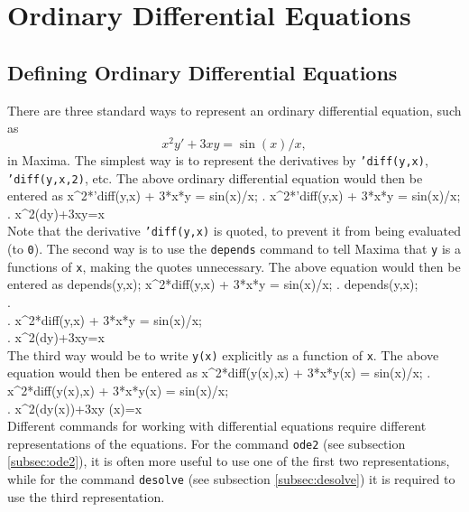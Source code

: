 \documentclass{article}
\begin{document}
\section{Ordinary Differential Equations}

\subsection{Defining Ordinary Differential Equations}

There are three standard ways to represent an ordinary differential
equation, such as 
$$ x^2y'+3xy=\sin(x)/x,$$
in Maxima.  The simplest way is to represent the derivatives by
\texttt{'diff(y,x)},\\
\texttt{'diff(y,x,2)}, etc.  The above ordinary
differential equation would then be entered as
\beginmaximasession
x^2*'diff(y,x) + 3*x*y = sin(x)/x;
\maximatexsession
{}.  x^2*'diff(y,x) + 3*x*y = sin(x)/x; \\
.   x^{2}\*\left({{d}}\*y\right)+3\*x\*y={{\sin x}} \\
\endmaximasession
\noindent
Note that the derivative \texttt{'diff(y,x)} is quoted, to prevent it
from being evaluated (to \texttt{0}).  
The second way is to use the \texttt{depends} command to tell Maxima
that \texttt{y} is a functions of \texttt{x}, making the quotes
unnecessary.   The above equation would then be entered as
\beginmaximasession
depends(y,x);
x^2*diff(y,x) + 3*x*y = sin(x)/x;
\maximatexsession
{}.  depends(y,x); \\
.     \\
.  x^2*diff(y,x) + 3*x*y = sin(x)/x; \\
.   x^{2}\*\left({{d}}\*y\right)+3\*x\*y={{\sin x}} \\
\endmaximasession
\noindent
The third way would be to write \texttt{y(x)} explicitly as a function
of \texttt{x}.  The above equation would then be entered as
\beginmaximasession
x^2*diff(y(x),x) + 3*x*y(x) = sin(x)/x;
\maximatexsession
{}.  x^2*diff(y(x),x) + 3*x*y(x) = sin(x)/x; \\
.   x^{2}\*\left({{d}}\*y\left(x\right)\right)+3\*x\*y
 \left(x\right)={{\sin x}} \\
\endmaximasession
\noindent
Different commands for working with differential equations require
different representations of the equations.  For the command
\texttt{ode2} (see subsection \ref{subsec:ode2}), it is often more useful
to use one of the first two representations, while for the command 
\texttt{desolve} (see subsection \ref{subsec:desolve})
it is required to use the third representation.
\end{document}

